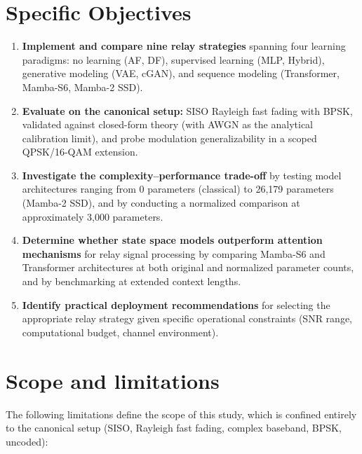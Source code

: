 \section{Specific Objectives}\label{sec:specific-objectives}

\begin{enumerate}
\def\labelenumi{\arabic{enumi}.}
\item
  \textbf{Implement and compare nine relay strategies} spanning four learning paradigms: no learning (AF, DF), supervised learning (MLP, Hybrid), generative modeling (VAE, cGAN), and sequence modeling (Transformer, Mamba-S6, Mamba-2 SSD).
\item
  \textbf{Evaluate on the canonical setup:} SISO Rayleigh fast fading with BPSK, validated against closed-form theory (with AWGN as the analytical calibration limit), and probe modulation generalizability in a scoped QPSK/16-QAM extension.
\item
  \textbf{Investigate the complexity--performance trade-off} by testing model architectures ranging from 0 parameters (classical) to 26,179 parameters (Mamba-2 SSD), and by conducting a normalized comparison at approximately 3,000 parameters.
\item
  \textbf{Determine whether state space models outperform attention mechanisms} for relay signal processing by comparing Mamba-S6 and Transformer architectures at both original and normalized parameter counts, and by benchmarking at extended context lengths.
\item
  \textbf{Identify practical deployment recommendations} for selecting the appropriate relay strategy given specific operational constraints (SNR range, computational budget, channel environment).
\end{enumerate}

\section{Scope and limitations}\label{sec:scope-and-delimitations}

The following limitations define the scope of this study, which is confined entirely to the canonical setup (SISO, Rayleigh fast fading, complex baseband, BPSK, uncoded):

